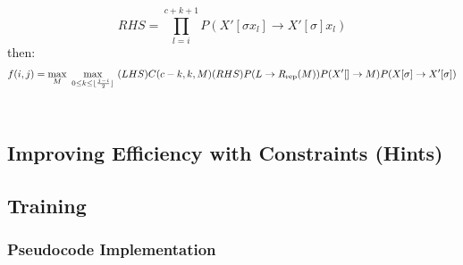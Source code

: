 \documentclass[11pt]{article}
\begin{document}
\[
 RHS = \prod_{l=i}^{c+k+1}P(X'[\sigma x_l] \rightarrow X'[\sigma]x_l)
\]
then:
\[
 f(i, j) = \mathop{\mbox{max}}_{M} \ \mathop{\mbox{max}}_{0 \le k \le \lfloor \frac{j - i}{2} \rfloor} \ (LHS)C(c-k, k, M)(RHS)P(L \rightarrow R_\text{rep}(M))P(X'[] \rightarrow M)P(X[\sigma] \rightarrow X'[\sigma])  \\
\]
\ \\

\subsection {Improving Efficiency with Constraints (Hints)}

\subsection {Training}
\subsubsection {Pseudocode Implementation}

\end{document}
